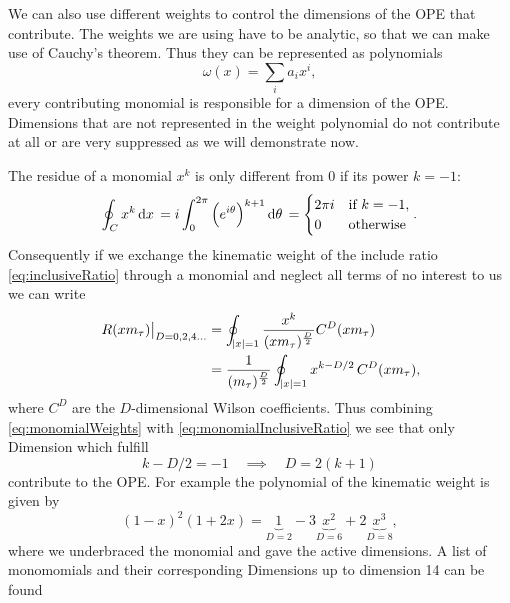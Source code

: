 \documentclass[../../index.tex]{subfiles}
\begin{document}
We can also use different weights to control the dimensions of the OPE that
contribute. The weights we are using have to be analytic, so that we can make
use of Cauchy's theorem. Thus they can be represented as polynomials
\begin{equation}
  \omega(x) = \sum_i a_i x^i,
\end{equation}
every contributing monomial is responsible for a dimension of the OPE.
Dimensions that are not represented in the weight polynomial do not contribute
at all or are very suppressed as we will demonstrate now.

The residue of a monomial $x^k$ is only different from 0 if its power $k=-1$:
\begin{equation}
  \label{eq:monomialWeights}
  \oint_{C} x^k \dif x = i \int_0^{2\pi}\left(e^{i \theta}\right)^{k+1} \dif \theta
  = \begin{cases} \mbox{$2 \pi i$} & \mbox{if } k=-1, \\ \mbox{0} & \mbox{otherwise} \end{cases}.
\end{equation}
Consequently if we exchange the kinematic weight of the include ratio
\cref{eq:inclusiveRatio} through a monomial and neglect all terms of no interest
to us we can write
\begin{equation}
  \label{eq:monomialInclusiveRatio}
  \begin{split}
  \left. R(x m_\tau) \right\rvert_{D=0,2,4\dots} &= \oint_{\abs{x}=1} \frac{x^k}{(x m_\tau)^{\frac{D}{2}}}C^{D}(x m_\tau) \\
  &= \frac{1}{(m_\tau)^{\frac{D}{2}}} \oint_{\abs{x}=1} x^{k-D/2} \,C^{D}(x m_\tau),
  \end{split}
\end{equation}
where $C^{D}$ are the $D$-dimensional Wilson coefficients. Thus combining
\cref{eq:monomialWeights} with \cref{eq:monomialInclusiveRatio} we see that
only Dimension  which fulfill
\begin{equation}
  k - D/2 = -1 \quad \implies \quad  D = 2(k+1)
\end{equation}
contribute to the OPE. For example the polynomial of the kinematic weight is
given by
\begin{equation}
  (1 - x)^2 (1 + 2x) = \underbrace{1}_{D=2} - 3\underbrace{x^2}_{D=6} + 2\underbrace{x^3}_{D=8},
\end{equation}
where we underbraced the monomial and gave the active dimensions. A list of
monomomials and their corresponding Dimensions up to dimension 14 can be found
\end{document}

